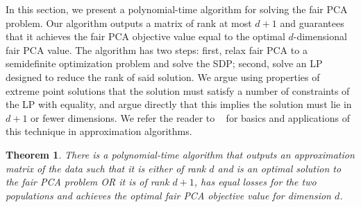 \documentclass{article}
\newtheorem{theorem}{Theorem}[section]
\begin{document}
In this section, we present a polynomial-time algorithm for solving the fair PCA problem. Our algorithm outputs a matrix of rank at most $d+1$ and guarantees that it achieves the fair PCA objective value equal to the optimal
$d$-dimensional fair PCA value.  The algorithm
has two steps: first, relax fair PCA to a semidefinite optimization
problem and solve the SDP; second, solve an LP designed to reduce the rank of said solution. We
argue using properties of extreme point solutions that the solution must satisfy a
number of constraints of the LP with equality, and argue directly that this
implies the solution must lie in $d+1$ or fewer dimensions. We refer the reader to ~\cite{lau2011iterative} for basics and applications of this technique in approximation algorithms.

\begin{theorem}
\label{thm:main}
There is a polynomial-time algorithm that outputs an approximation matrix of the data such that it is either of rank $d$ and is an optimal solution to the fair PCA problem OR it is of rank $d+1$, has equal losses for the two populations and achieves the optimal fair PCA objective value for dimension $d$.
\end{theorem}
\end{document}
